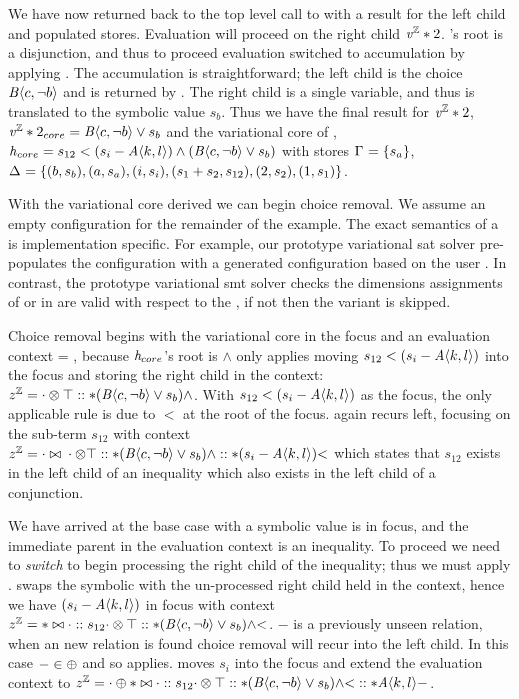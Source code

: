 We have now returned back to the top level call to \evAnd{} with a result for
the left child and populated stores. Evaluation will proceed on the right child
$\mathit{v^{\mathbb{Z}}}*{2}$. 's root is a disjunction, and thus to proceed evaluation
switched to accumulation by applying \evAcc{}. The accumulation is
straightforward; the left child is the choice $\chc[B]{c, \neg b}$ and is
returned by \acChc{}. The right child is a single variable, and thus is
translated to the symbolic value $s_{b}$. Thus we have the final result for
$\mathit{v^{\mathbb{Z}}}*{2}$, $\eIL*{2}_{core} = \chc[B]{c,\neg b} \vee{} s_{b}$ and the
variational core of \hV{}, $\hV{}_{core} = s_{12} < (s_{i} - \chc[A]{k,l})
\wedge{} (\chc[B]{c,\neg b} \vee{} s_{b})$ with stores $\eStore{}=\set{s_{a}}$,
$\aStore{}=\set{(b, s_{b}),(a,s_{a}),(i, s_{i}),(s_{1} + s_{2}, s_{12}),
  (2,s_{2}), (1,s_{1})}$.

With the variational core derived we can begin choice removal. We assume an
empty configuration for the remainder of the example. The exact semantics of a
\vc{} is implementation specific. For example, our prototype variational
\ac{sat} solver pre-populates the configuration with a generated configuration
based on the user \vc{}. In contrast, the prototype variational \ac{smt} solver
checks the dimensions assignments of \true{} or \false{} in \crChc{} are valid
with respect to the \vc{}, if not then the variant is skipped.

Choice removal begins with the variational core in the focus and an evaluation
context \zipper{} = \inRoot{}, because $\mathit{h}_{core}$'s root is $\wedge$ only
\crBool{} applies moving $s_{12} < (s_{i} - \chc[A]{k,l})$ into the focus and
storing the right child in the context: $\zipper =
\inBoolL*{\inRoot{}}{(\chc[B]{c,\neg b} \vee{} s_{b})}{\wedge}$. With $s_{12} <
(s_{i} - \chc[A]{k,l})$ as the focus, the only applicable rule is \crInEq{} due
to $<$ at the root of the focus. \crInEq{} again recurs left, focusing on the
sub-term $s_{12}$ with context $\zipper =
\inInEqL*{\inBoolL*{\inRoot{}}{(\chc[B]{c,\neg b} \vee{} s_{b})}{\wedge}}{(s_{i}
  - \chc[A]{k,l})}{<}$ which states that $s_{12}$ exists in the left child of an
inequality which also exists in the left child of a conjunction.

We have arrived at the base case with a symbolic value is in focus, and the
immediate parent in the evaluation context is an inequality. To proceed we need
to \emph{switch} to begin processing the right child of the inequality; thus we
must apply \crInEqL{}. \crInEqL{} swaps the symbolic with the un-processed right
child held in the context, hence we have $(s_{i} - \chc[A]{k,l})$ in focus with
context $\zipper = \inInEqR*{s_{12}}{\inBoolL*{\inRoot{}}{(\chc[B]{c,\neg b}
    \vee{} s_{b})}{\wedge}}{<}$. $-$ is a previously unseen relation, when an
new relation is found choice removal will recur into the left child. In this
case $- \in \oplus{}{}$ and so \crArith{} applies. \crArith{} moves $s_{i}$
into the focus and extend the evaluation context to $\zipper =
\inArithL*{\inInEqR*{s_{12}}{\inBoolL*{\inRoot{}}{(\chc[B]{c,\neg b} \vee{}
      s_{b})}{\wedge}}{<}}{\chc[A]{k,l}}{-}$.

